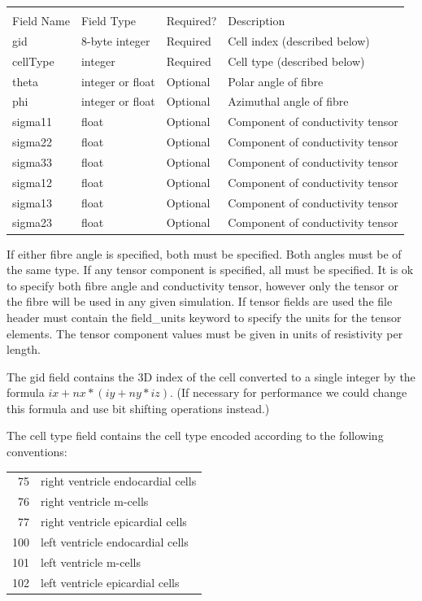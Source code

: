 \documentclass{article}
\begin{document}
\begin{tabular}{l|l|l|p{}}
  & & & \\
  Field Name & Field Type & Required? & Description\\
  \hline
  gid &      8-byte integer   & Required & Cell index (described below)\\
  cellType & integer          & Required & Cell type (described below)\\
  theta &    integer or float & Optional & Polar angle of fibre\\
  phi &      integer or float & Optional & Azimuthal angle of fibre\\
  sigma11 &  float            & Optional & Component of conductivity tensor\\
  sigma22 &  float            & Optional & Component of conductivity tensor\\
  sigma33 &  float            & Optional & Component of conductivity tensor\\
  sigma12 &  float            & Optional & Component of conductivity tensor\\
  sigma13 &  float            & Optional & Component of conductivity tensor\\
  sigma23 &  float            & Optional & Component of conductivity tensor\\
\end{tabular}

\bigskip
If either fibre angle is specified, both must be specified.  Both angles
must be of the same type.  If any tensor component is specified, all
must be specified.  It is ok to specify both fibre angle and
conductivity tensor, however only the tensor or the fibre will be used
in any given simulation.  If tensor fields are used the file header must
contain the field\_units keyword to specify the units for the tensor
elements.  The tensor component values must be given in units of
resistivity per length.

The gid field contains the 3D index of the cell converted to a single
integer by the formula $ix + nx*(iy + ny*iz)$.  (If necessary for
performance we could change this formula and use bit shifting operations
instead.)

The cell type field contains the cell type encoded according to the
following conventions:
\begin{center}
  \begin{tabular}{rl}
    75 & right ventricle endocardial cells\\
    76 & right ventricle m-cells\\
    77 & right ventricle epicardial cells\\
    100 & left ventricle endocardial cells\\
    101 & left ventricle m-cells\\
    102 & left ventricle epicardial cells\\
  \end{tabular}
\end{center}
\end{document}
